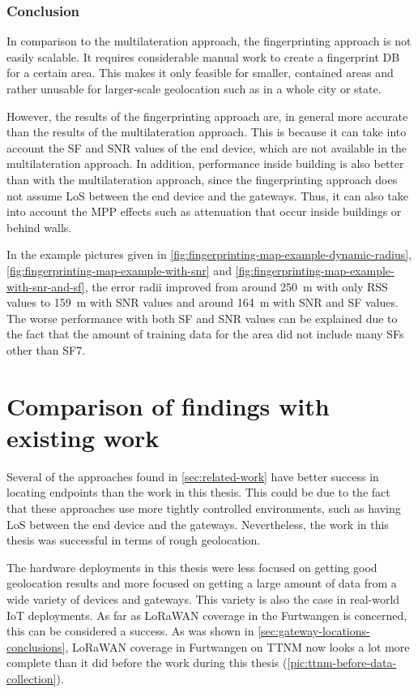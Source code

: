 \subsubsection{Conclusion}

In comparison to the multilateration approach, the fingerprinting approach is not easily scalable.
It requires considerable manual work to create a fingerprint \ac{DB} for a certain area.
This makes it only feasible for smaller, contained areas and rather unusable for larger-scale geolocation such as in a whole city or state.

However, the results of the fingerprinting approach are, in general more accurate than the results of the multilateration approach.
This is because it can take into account the \ac{SF} and \ac{SNR} values of the end device, which are not available in the multilateration approach.
In addition, performance inside building is also better than with the multilateration approach, since the fingerprinting approach does not assume \ac{LoS} between the end device and the gateways.
Thus, it can also take into account the \ac{MPP} effects such as attenuation that occur inside buildings or behind walls.

In the example pictures given in \cref{fig:fingerprinting-map-example-dynamic-radius}, \cref{fig:fingerprinting-map-example-with-snr} and \cref{fig:fingerprinting-map-example-with-snr-and-sf}, the error radii improved from around \SI{250}{\meter} with only \ac{RSS} values to \SI{159}{\meter} with \ac{SNR} values and around \SI{164}{\meter} with \ac{SNR} and \ac{SF} values.
The worse performance with both \ac{SF} and \ac{SNR} values can be explained due to the fact that the amount of training data for the area did not include many \aclp{SF} other than \acs{SF}7.

\section{Comparison of findings with existing work}

Several of the approaches found in \cref{sec:related-work} have better success in locating endpoints than the work in this thesis.
This could be due to the fact that these approaches use more tightly controlled environments, such as having \ac{LoS} between the end device and the gateways.
Nevertheless, the work in this thesis was successful in terms of rough geolocation.

The hardware deployments in this thesis were less focused on getting good geolocation results and more focused on getting a large amount of data from a wide variety of devices and gateways.
This variety is also the case in real-world \ac{IoT} deployments.
As far as \ac{LoRaWAN} coverage in the Furtwangen is concerned, this can be considered a success.
As was shown in \cref{sec:gateway-locations-conclusions}, \ac{LoRaWAN} coverage in Furtwangen on \ac{TTNM} now looks a lot more complete than it did before the work during this thesis (\cref{pic:ttnm-before-data-collection}).

